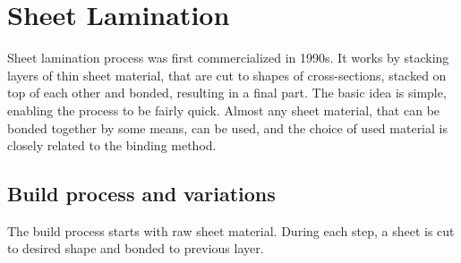 \documentclass[a4paper, twoside, 11pt]{report}
\begin{document}
\chapter{Sheet Lamination}
Sheet lamination process was first commercialized in 1990s. It works by stacking layers of thin sheet material, that are cut to shapes of cross-sections, stacked on top of each other and bonded, resulting in a final part. The basic idea is simple, enabling the process to be fairly quick. Almost any sheet material, that can be bonded together by some means, can be used, and the choice of used material is closely related to the binding method.

\section{Build process and variations}
The build process starts with raw sheet material. During each step, a sheet is cut to desired shape and bonded to previous layer.
\end{document}
